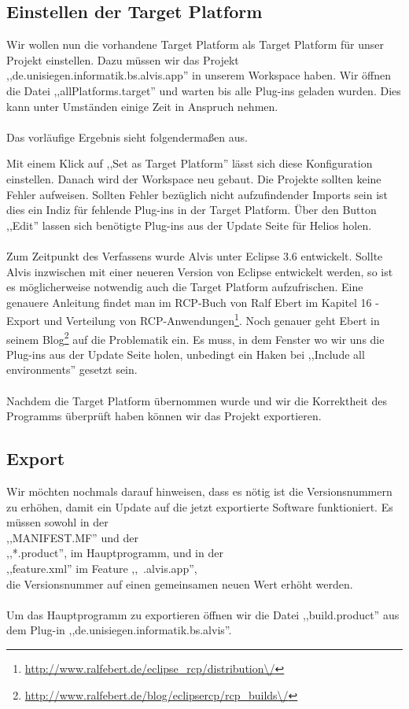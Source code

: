 \documentclass[10pt,a4paper,oneside]{scrbook}
\begin{document}
\subsection{Einstellen der Target Platform}
Wir wollen nun die vorhandene Target Platform als Target Platform für unser Projekt einstellen. Dazu müssen wir das Projekt\\
,,de.unisiegen.informatik.bs.alvis.app'' in unserem Workspace haben. Wir öffnen die Datei ,,allPlatforms.target'' und warten bis alle Plug-ins geladen wurden. Dies kann unter Umständen einige Zeit in Anspruch nehmen. 
\\ \\
Das vorläufige Ergebnis sieht folgendermaßen aus.
\begin{center}
\end{center}

Mit einem Klick auf ,,Set as Target Platform'' lässt sich diese Konfiguration einstellen. 
Danach wird der Workspace neu gebaut. Die Projekte sollten keine Fehler aufweisen. Sollten Fehler bezüglich nicht aufzufindender Imports sein ist dies ein Indiz für fehlende Plug-ins in der Target Platform. Über den Button ,,Edit'' lassen sich benötigte Plug-ins aus der Update Seite für Helios holen.
\\ \\
Zum Zeitpunkt des Verfassens wurde Alvis unter Eclipse 3.6 entwickelt. Sollte Alvis inzwischen mit einer neueren Version von Eclipse entwickelt werden, so ist es möglicherweise notwendig auch die Target Platform aufzufrischen. Eine genauere Anleitung findet man im RCP-Buch von Ralf Ebert im Kapitel 16 - Export und Verteilung von RCP-Anwendungen\footnote{\url{http://www.ralfebert.de/eclipse\_rcp/distribution\/}}. Noch genauer geht Ebert in seinem Blog\footnote{\url{http://www.ralfebert.de/blog/eclipsercp/rcp\_builds\/}} auf die Problematik ein. Es muss, in dem Fenster wo wir uns die Plug-ins aus der Update Seite holen, unbedingt ein Haken bei ,,Include all environments'' gesetzt sein.
\\ \\

Nachdem die Target Platform übernommen wurde und wir die Korrektheit des Programms überprüft haben können wir das Projekt exportieren. 
\subsection{Export}
Wir möchten nochmals darauf hinweisen, dass es nötig ist die Versionsnummern zu erhöhen, damit ein Update auf die jetzt exportierte Software funktioniert. Es müssen sowohl in der \\
,,MANIFEST.MF'' und der \\
,,*.product'', im Hauptprogramm, und in der \\
,,feature.xml'' im Feature ,,~.alvis.app'', \\
die Versionsnummer auf einen gemeinsamen neuen Wert erhöht werden.
\\ \\
Um das Hauptprogramm zu exportieren öffnen wir die Datei ,,build.product'' aus dem Plug-in ,,de.unisiegen.informatik.bs.alvis''.
\end{document}
